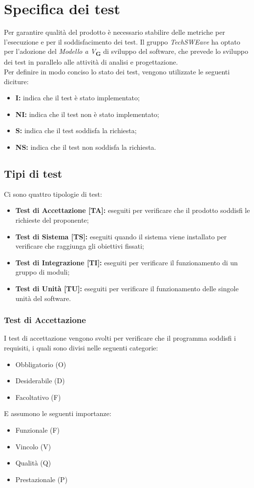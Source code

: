 \section{Specifica dei test}
Per garantire qualità del prodotto è necessario stabilire delle metriche per l’esecuzione e per il soddisfacimento dei test. 
Il gruppo \textit{TechSWEave} ha optato per l'adozione del \textit{Modello a V}\textsubscript{\textbf{G}} di sviluppo del software, che 
prevede lo sviluppo dei test in parallelo alle attività di analisi e progettazione.\\
Per definire in modo conciso lo stato dei test, vengono utilizzate le seguenti diciture:
\begin{itemize}
    \item \textbf{I:} indica che il test è stato implementato;
    \item \textbf{NI:} indica che il test non è stato implementato;
    \item \textbf{S:} indica che il test soddisfa la richiesta;
    \item \textbf{NS:} indica che il test non soddisfa la richiesta.
\end{itemize}
\subsection{Tipi di test}
Ci sono quattro tipologie di test:
\begin{itemize}
    \item \textbf{Test di Accettazione [TA]:} eseguiti per verificare che il prodotto soddisfi le richieste del proponente;
    \item \textbf{Test di Sistema [TS]:} eseguiti quando il sistema viene installato per verificare che raggiunga gli obiettivi fissati;
    \item \textbf{Test di Integrazione [TI]:} eseguiti per verificare il funzionamento di un gruppo di moduli;
    \item \textbf{Test di Unit\`a [TU]:} eseguiti per verificare il funzionamento delle singole unit\`a del software.
\end{itemize}
\subsubsection{Test di Accettazione}
I test di accettazione vengono svolti per verificare che il programma soddisfi i requisiti, i quali sono divisi nelle seguenti categorie:
\begin{itemize}
    \item Obbligatorio (O)
    \item Desiderabile (D)
    \item Facoltativo (F)
\end{itemize}
E assumono le seguenti importanze:
\begin{itemize}
    \item Funzionale (F)
    \item Vincolo (V)
    \item Qualit\`a (Q)
    \item Prestazionale (P)
\end{itemize}

